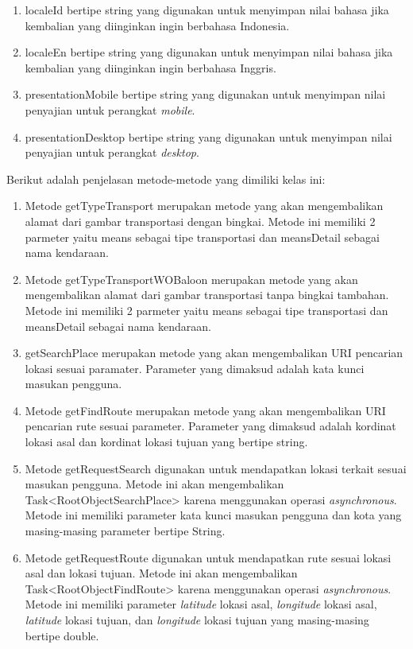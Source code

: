 \begin{enumerate}
	\item localeId bertipe string yang digunakan untuk menyimpan nilai bahasa jika kembalian yang diinginkan ingin berbahasa Indonesia.
	\item localeEn bertipe string yang digunakan untuk menyimpan nilai bahasa jika kembalian yang diinginkan ingin berbahasa Inggris.
	\item presentationMobile bertipe string yang digunakan untuk menyimpan nilai penyajian untuk perangkat \textit{mobile}.
	\item presentationDesktop bertipe string yang digunakan untuk menyimpan nilai penyajian untuk perangkat \textit{desktop}.
\end{enumerate}

Berikut adalah penjelasan metode-metode yang dimiliki kelas ini:
\begin{enumerate}
	\item Metode getTypeTransport merupakan metode yang akan mengembalikan alamat dari gambar transportasi dengan bingkai. Metode ini memiliki 2 parmeter yaitu means sebagai tipe transportasi dan meansDetail sebagai nama kendaraan.
	\item Metode getTypeTransportWOBaloon merupakan metode yang akan mengembalikan alamat dari gambar transportasi tanpa bingkai tambahan. Metode ini memiliki 2 parmeter yaitu means sebagai tipe transportasi dan meansDetail sebagai nama kendaraan.
	\item getSearchPlace merupakan metode yang akan mengembalikan URI pencarian lokasi sesuai paramater. Parameter yang dimaksud adalah kata kunci masukan pengguna.
	\item Metode getFindRoute merupakan metode yang akan mengembalikan URI pencarian rute sesuai parameter. Parameter yang dimaksud adalah kordinat lokasi asal dan kordinat lokasi tujuan yang bertipe string.
	\item Metode getRequestSearch digunakan untuk mendapatkan lokasi terkait sesuai masukan pengguna. Metode ini akan mengembalikan Task<RootObjectSearchPlace> karena menggunakan operasi \textit{asynchronous}. Metode ini memiliki parameter kata kunci masukan pengguna dan kota yang masing-masing parameter bertipe String.
		\item Metode getRequestRoute digunakan untuk mendapatkan rute sesuai lokasi asal dan lokasi tujuan. Metode ini akan mengembalikan Task<RootObjectFindRoute> karena menggunakan operasi \textit{asynchronous}. Metode ini memiliki parameter \textit{latitude} lokasi asal, \textit{longitude} lokasi asal, \textit{latitude} lokasi tujuan, dan \textit{longitude} lokasi tujuan yang masing-masing bertipe double.
\end{enumerate}

